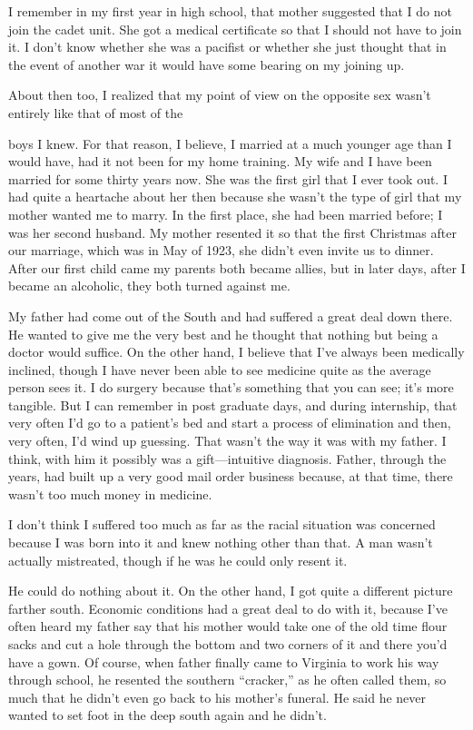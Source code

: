 I remember in my first year in high school, that mother suggested that I do not join the cadet unit. She got a medical certificate so that I should not have to join it. I don’t know whether she was a pacifist or whether she just thought that in the event of another war it would have some bearing on my joining up.

About then too, I realized that my point of view on the opposite sex wasn’t entirely like that of most of the

boys I knew. For that reason, I believe, I married at a much younger age than I would have, had it not been for my home training. My wife and I have been married for some thirty years now. She was the first girl that I ever took out. I had quite a heartache about her then because she wasn’t the type of girl that my mother wanted me to marry. In the first place, she had been married before; I was her second husband. My mother resented it so that the first Christmas after our marriage, which was in May of 1923, she didn’t even invite us to dinner. After our first child came my parents both became allies, but in later days, after I became an alcoholic, they both turned against me.

My father had come out of the South and had suffered a great deal down there. He wanted to give me the very best and he thought that nothing but being a doctor would suffice. On the other hand, I believe that I’ve always been medically inclined, though I have never been able to see medicine quite as the average person sees it. I do surgery because that’s something that you can see; it’s more tangible. But I can remember in post graduate days, and during internship, that very often I’d go to a patient’s bed and start a process of elimination and then, very often, I’d wind up guessing. That wasn’t the way it was with my father. I think, with him it possibly was a gift—intuitive diagnosis. Father, through the years, had built up a very good mail order business because, at that time, there wasn’t too much money in medicine.

I don’t think I suffered too much as far as the racial situation was concerned because I was born into it and knew nothing other than that. A man wasn’t actually mistreated, though if he was he could only resent it.

He could do nothing about it. On the other hand, I got quite a different picture farther south. Economic conditions had a great deal to do with it, because I’ve often heard my father say that his mother would take one of the old time flour sacks and cut a hole through the bottom and two corners of it and there you’d have a gown. Of course, when father finally came to Virginia to work his way through school, he resented the southern “cracker,” as he often called them, so much that he didn’t even go back to his mother’s funeral. He said he never wanted to set foot in the deep south again and he didn’t.

